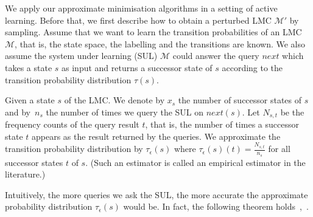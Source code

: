 \documentclass[a4paper,UKenglish,cleveref,autoref,thm-restate]{lipics-v2021}
\newcommand{\nxt}{\mathit{next}}
\newcommand{\M}{\mathcal{M}}
\newcommand{\Hyp}{\mathcal{M}'}%
\newcommand{\tauHyp}{\tau_{\epsilon}}
\begin{document}

We apply our approximate minimisation algorithms in a setting of active learning. Before that, we first describe how to obtain a perturbed LMC $\Hyp$ by sampling. Assume that we want to learn the transition probabilities of an LMC $\M$, that is, the state space, the labelling and the transitions are known. We also assume the system under learning (SUL) $\M$ could answer the query $\nxt$ which takes a state $s$ as input and returns a successor state of $s$ according to the transition probability distribution $\tau(s)$.

Given a state $s$ of the LMC. We denote by $x_s$ the number of successor states of $s$ and by~$n_s$ the number of times we query the SUL on $\nxt(s)$. Let $N_{s,t}$ be the frequency counts of the query result $t$, that is, the number of times a successor state $t$ appears as the result returned by the queries. We approximate the transition probability distribution by $\tauHyp(s)$ where $\tauHyp(s)(t) = \frac{N_{s, t}}{n_s}$ for all successor states $t$ of $s$. (Such an estimator is called an empirical estimator in the literature.)

Intuitively, the more queries we ask the SUL, the more accurate the approximate probability distribution $\tauHyp(s)$ would be. In fact, the following theorem holds~\cite[Section~6.4]{BazilleGenestJegourelSun2020},~\cite{Chen2015}.
\end{document}
